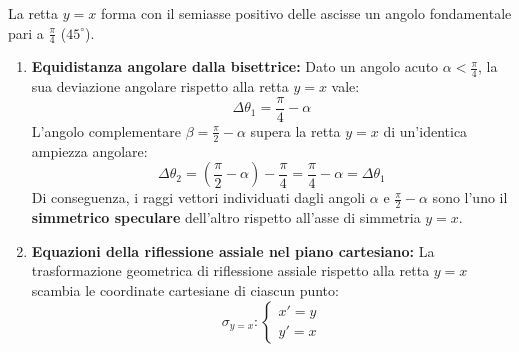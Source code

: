 \documentclass[11pt,a4paper,oneside]{report}
\begin{document}
\begin{teorema}
La retta $y = x$ forma con il semiasse positivo delle ascisse un angolo fondamentale pari a $\frac{\pi}{4}$ ($45^\circ$).
\begin{enumerate}
    \item \textbf{Equidistanza angolare dalla bisettrice:}
    Dato un angolo acuto $\alpha < \frac{\pi}{4}$, la sua deviazione angolare rispetto alla retta $y = x$ vale:
    \begin{equation}
        \Delta\theta_1 = \frac{\pi}{4} - \alpha
    \end{equation}
    L'angolo complementare $\beta = \frac{\pi}{2} - \alpha$ supera la retta $y = x$ di un'identica ampiezza angolare:
    \begin{equation}
        \Delta\theta_2 = \left(\frac{\pi}{2} - \alpha\right) - \frac{\pi}{4} = \frac{\pi}{4} - \alpha = \Delta\theta_1
    \end{equation}
    Di conseguenza, i raggi vettori individuati dagli angoli $\alpha$ e $\frac{\pi}{2} - \alpha$ sono l'uno il \textbf{simmetrico speculare} dell'altro rispetto all'asse di simmetria $y = x$.
    
    \item \textbf{Equazioni della riflessione assiale nel piano cartesiano:}
    La trasformazione geometrica di riflessione assiale rispetto alla retta $y = x$ scambia le coordinate cartesiane di ciascun punto:
    \begin{equation}
        \sigma_{y=x} \colon \begin{cases}
            x' = y \\
            y' = x
        \end{cases}
    \end{equation}
    

\end{enumerate}
\end{teorema}
\end{document}
